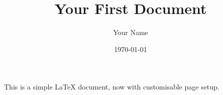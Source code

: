 \documentclass{article}
\begin{document}
\title{Your First Document}
\author{Your Name}
\date{\today}

\maketitle

This is a simple LaTeX document, now with customisable page setup.
\end{document}
